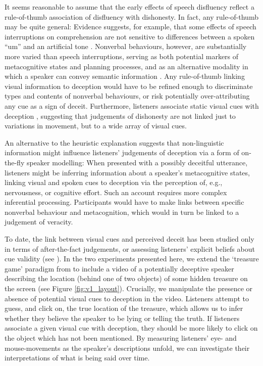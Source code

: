 \documentclass[a4paper,man,natbib]{apa6}
\newcommand*{\spex}[1]{``{#1}''} %
\begin{document}
It seems reasonable to assume that the early effects of speech disfluency reflect a rule-of-thumb association of disfluency with dishonesty.
In fact, any rule-of-thumb may be quite general:  Evidence suggests, for example, that some effects of speech interruptions on comprehension are not sensitive to differences between a spoken \spex{um} and an artificial tone \citep{Corley2011}.
Nonverbal behaviours, however, are substantially more varied than speech interruptions, serving as both potential markers of metacognitive states and planning processes, and as an alternative modality in which a speaker can convey semantic information \citep[See, e.g.][]{Ekman1969,Mcneill1992}.
Any rule-of-thumb linking visual information to deception would have to be refined enough to discriminate types and contents of nonverbal behaviours, or risk potentially over-attributing any cue as a sign of deceit.
Furthermore, listeners associate static visual cues with deception \citep[e.g. eye-gaze,][]{Zuckerman1981a}, suggesting that judgements of dishonesty are not linked just to variations in movement, but to a wide array of visual cues. 

An alternative to the heuristic explanation suggests that non-linguistic information might influence listeners' judgements of deception via a form of on-the-fly speaker modelling: 
When presented with a possibly deceitful utterance, listeners might be inferring information about a speaker's metacognitive states, linking visual and spoken cues to deception via the perception of, e.g., nervousness, or cognitive effort. 
Such an account requires more complex inferential processing.
Participants would have to make links between specific nonverbal behaviour and metacognition, which would in turn be linked to a judgement of veracity.

To date, the link between visual cues and perceived deceit has been studied only in terms of after-the-fact judgements, or assessing listeners' explicit beliefs about cue validity (see \citealt{Vrij1996a, Zuckerman1981a}).
In the two experiments presented here, we extend the `treasure game' paradigm from \citet{Loy2017} to include a video of a potentially deceptive speaker describing the location (behind one of two objects) of some hidden treasure on the screen (see Figure \ref{fig:v1_layout}).
Crucially, we manipulate the presence or absence of potential visual cues to deception in the video.
Listeners attempt to guess, and click on, the true location of the treasure, which allows us to infer whether they believe the speaker to be lying or telling the truth.
If listeners associate a given visual cue with deception, they should be more likely to click on the object which has not been mentioned.
By measuring listeners' eye- and mouse-movements as the speaker's descriptions unfold, we can investigate their interpretations of what is being said over time.
\end{document}
